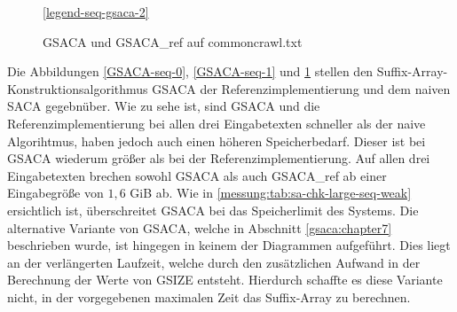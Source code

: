 \begin{figure}[ht]

    \medskip
    \ref{legend-seq-gsaca-2}
    \caption{GSACA und GSACA_ref auf commoncrawl.txt}
    \label{GSACA-seq-2}
\end{figure}
\FloatBarrier

Die  Abbildungen \cref{GSACA-seq-0}, \cref{GSACA-seq-1} und \cref{GSACA-seq-2} stellen den Suffix-Array-Konstruktionsalgorithmus GSACA der Referenzimplementierung und dem naiven SACA gegebnüber.
Wie zu sehe ist, sind GSACA und die Referenzimplementierung bei allen drei Eingabetexten schneller als der naive Algorihtmus,
haben jedoch auch einen höheren Speicherbedarf.
Dieser ist bei GSACA wiederum größer als bei der Referenzimplementierung.
Auf allen drei Eingabetexten brechen sowohl GSACA als auch GSACA_ref ab einer Eingabegröße von $1{,}6$ GiB ab.
Wie in \cref{messung:tab:sa-chk-large-seq-weak} ersichtlich ist, überschreitet GSACA bei das Speicherlimit des Systems.
Die alternative Variante von GSACA, welche in Abschnitt \ref{gsaca:chapter7} beschrieben wurde, ist hingegen in keinem der Diagrammen aufgeführt.
Dies liegt an der verlängerten Laufzeit, welche durch den zusätzlichen Aufwand in der Berechnung der Werte von GSIZE entsteht.
Hierdurch schaffte es diese Variante nicht, in der vorgegebenen maximalen Zeit das Suffix-Array zu berechnen.